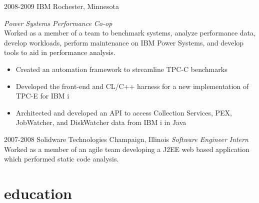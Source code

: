 \documentclass{friggeri-cv} %
\begin{document}
\begin{entrylist}
\entry
{2008-2009}
{IBM}
{Rochester, Minnesota}
{\emph{Power Systems Performance Co-op} \\
Worked as a member of a team to benchmark systems, analyze performance data, develop workloads, perform
maintenance on IBM Power Systems, and develop tools to aid in performance analysis. 
\begin{itemize}
\item Created an automation framework to streamline TPC-C benchmarks
\item Developed the front-end and CL/C++ harness for a new implementation of TPC-E for IBM i
\item Architected and developed an API to access Collection Services, PEX, JobWatcher, and DiskWatcher data from IBM i in Java
\end{itemize}}
\end{entrylist}
\begin{entrylist}
\entry
{2007-2008}
{Solidware Technologies}
{Champaign, Illinois}
{\emph{Software Engineer Intern} \\
Worked as a member of an agile team developing a J2EE web based application which performed static code analysis.} \\
\end{entrylist}


\section{education}
\end{document}
